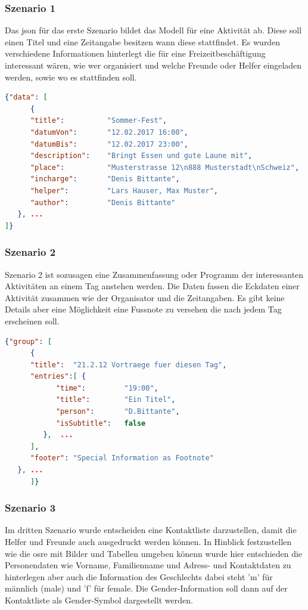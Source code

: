 \documentclass[main.tex]{subfiles}
\begin{document}
\subsubsection{Szenario 1}
Das \acrlong{json} für das erste Szenario bildet das Modell für eine Aktivität ab. Diese soll einen Titel und eine Zeitangabe besitzen wann diese stattfindet. Es wurden verschiedene Informationen hinterlegt die für eine Freizeitbeschäftigung interessant wären, wie wer organisiert und welche Freunde oder Helfer eingeladen werden, sowie wo es stattfinden soll.  
\begin{lstlisting}[language=json]
{"data": [
      {
      "title":          "Sommer-Fest",
      "datumVon":       "12.02.2017 16:00",
      "datumBis":       "12.02.2017 23:00",
      "description":    "Bringt Essen und gute Laune mit",
      "place":          "Musterstrasse 12\n888 Musterstadt\nSchweiz",
      "incharge":       "Denis Bittante",
      "helper":         "Lars Hauser, Max Muster",
      "author":         "Denis Bittante"
   }, ...
]}


\end{lstlisting}


\subsubsection{Szenario 2}
Szenario 2 ist sozusagen eine Zusammenfassung oder Programm der interessanten Aktivitäten an einem Tag anstehen werden. Die Daten fassen die Eckdaten einer Aktivität zusammen wie der Organisator und die Zeitangaben. Es gibt keine Details aber eine Möglichkeit eine Fussnote zu versehen die nach jedem Tag erscheinen soll. 
\begin{lstlisting}[language=json]
{"group": [
      {
      "title":  "21.2.12 Vortraege fuer diesen Tag",
      "entries":[ {
            "time":         "19:00",
            "title":        "Ein Titel",
            "person":       "D.Bittante",
            "isSubtitle":   false
         },  ...
      ],
      "footer": "Special Information as Footnote"
   }, ...
      ]}


\end{lstlisting}


\subsubsection{Szenario 3}

Im dritten Szenario wurde entscheiden eine Kontaktliste darzustellen, damit die Helfer und Freunde auch ausgedruckt werden können. In Hinblick festzustellen wie die \acrlong{osre} mit Bilder und Tabellen umgeben könenn wurde hier entschieden die Personendaten wie Vorname, Familienname und Adress- und Kontaktdaten zu hinterlegen aber auch die Information des Geschlechts dabei steht 'm' für männlich (male) und 'f' für female. Die Gender-Information soll dann auf der Kontaktliste als Gender-Symbol dargestellt werden. 
\end{document}
